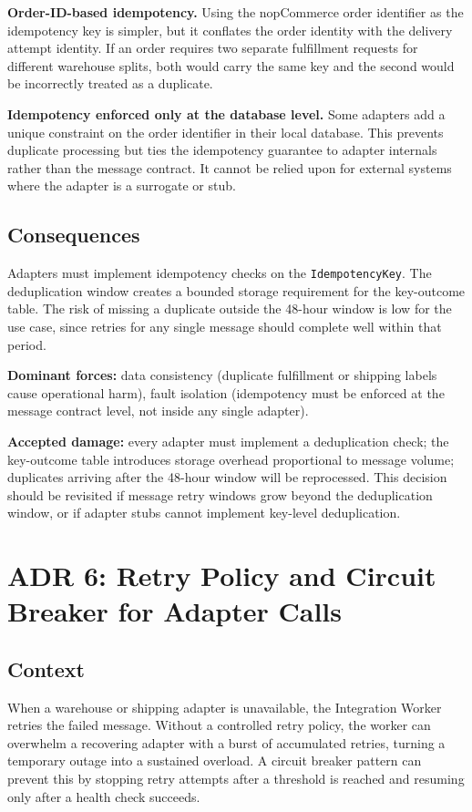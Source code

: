 \textbf{Order-ID-based idempotency.} Using the nopCommerce order identifier as the idempotency
key is simpler, but it conflates the order identity with the delivery attempt identity. If an
order requires two separate fulfillment requests for different warehouse splits, both would
carry the same key and the second would be incorrectly treated as a duplicate.

\textbf{Idempotency enforced only at the database level.} Some adapters add a unique constraint
on the order identifier in their local database. This prevents duplicate processing but ties
the idempotency guarantee to adapter internals rather than the message contract. It cannot be
relied upon for external systems where the adapter is a surrogate or stub.

\subsection{Consequences}

Adapters must implement idempotency checks on the \texttt{IdempotencyKey}. The deduplication
window creates a bounded storage requirement for the key-outcome table. The risk of missing a
duplicate outside the 48-hour window is low for the use case, since retries for any single
message should complete well within that period.

\textbf{Dominant forces:} data consistency (duplicate fulfillment or shipping labels cause
operational harm), fault isolation (idempotency must be enforced at the message contract
level, not inside any single adapter).

\textbf{Accepted damage:} every adapter must implement a deduplication check; the
key-outcome table introduces storage overhead proportional to message volume; duplicates
arriving after the 48-hour window will be reprocessed. This decision should be revisited if
message retry windows grow beyond the deduplication window, or if adapter stubs cannot
implement key-level deduplication.

\section{ADR 6: Retry Policy and Circuit Breaker for Adapter Calls}

\subsection{Context}

When a warehouse or shipping adapter is unavailable, the Integration Worker retries the failed
message. Without a controlled retry policy, the worker can overwhelm a recovering adapter with
a burst of accumulated retries, turning a temporary outage into a sustained overload. A circuit
breaker pattern can prevent this by stopping retry attempts after a threshold is reached and
resuming only after a health check succeeds.

